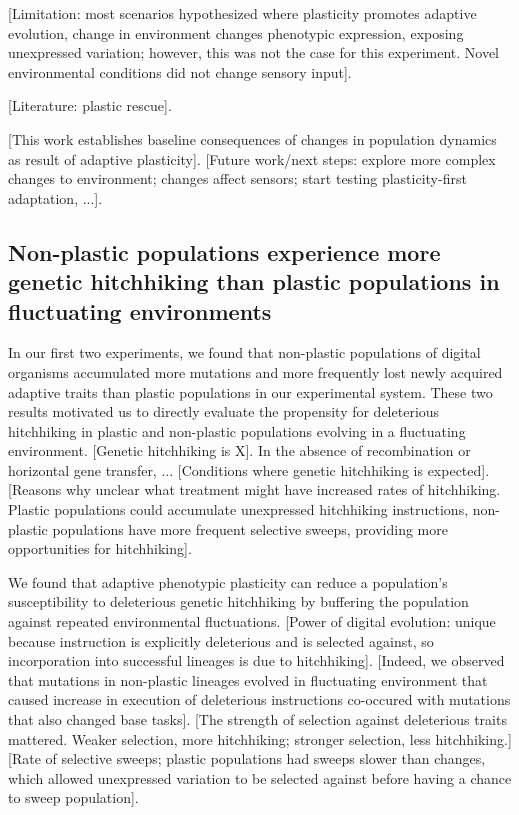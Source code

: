 [Limitation: most scenarios hypothesized where plasticity promotes adaptive evolution, change in environment changes phenotypic expression, exposing unexpressed variation; however, this was not the case for this experiment. Novel environmental conditions did not change sensory input].

[Literature: plastic rescue].

[This work establishes baseline consequences of changes in population dynamics as result of adaptive plasticity].
[Future work/next steps: explore more complex changes to environment; changes affect sensors; start testing plasticity-first adaptation, ...].

\subsection{Non-plastic populations experience more genetic hitchhiking than plastic populations in fluctuating environments}

In our first two experiments, we found that non-plastic populations of digital organisms accumulated more mutations and more frequently lost newly acquired adaptive traits than plastic populations in our experimental system.
These two results motivated us to directly evaluate the propensity for deleterious hitchhiking in plastic and non-plastic populations evolving in a fluctuating environment. 
[Genetic hitchhiking is X].
In the absence of recombination or horizontal gene transfer, ...
[Conditions where genetic hitchhiking is expected].
[Reasons why unclear what treatment might have increased rates of hitchhiking. Plastic populations could accumulate unexpressed hitchhiking instructions, non-plastic populations have more frequent selective sweeps, providing more opportunities for hitchhiking].

We found that adaptive phenotypic plasticity can reduce a population's susceptibility to deleterious genetic hitchhiking by buffering the population against repeated environmental fluctuations.
[Power of digital evolution: unique because instruction is explicitly deleterious and is selected against, so incorporation into successful lineages is due to hitchhiking].
[Indeed, we observed that mutations in non-plastic lineages evolved in fluctuating environment that caused increase in execution of deleterious instructions co-occured with mutations that also changed base tasks].
[The strength of selection against deleterious traits mattered. Weaker selection, more hitchhiking; stronger selection, less hitchhiking.]
[Rate of selective sweeps; plastic populations had sweeps slower than changes, which allowed unexpressed variation to be selected against before having a chance to sweep population].

